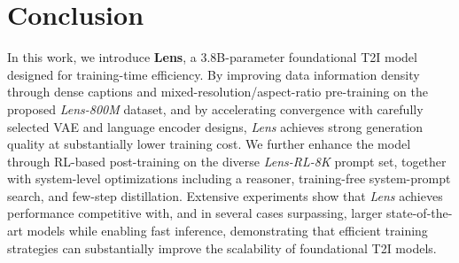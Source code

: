 
\section{Conclusion}

In this work, we introduce \textbf{Lens}, a 3.8B-parameter foundational T2I model designed for training-time efficiency. By improving data information density through dense captions and mixed-resolution/aspect-ratio pre-training on the proposed \textit{Lens-800M} dataset, and by accelerating convergence with carefully selected VAE and language encoder designs, \textit{Lens} achieves strong generation quality at substantially lower training cost. We further enhance the model through RL-based post-training on the diverse \textit{Lens-RL-8K} prompt set, together with system-level optimizations including a reasoner, training-free system-prompt search, and few-step distillation. Extensive experiments show that \textit{Lens} achieves performance competitive with, and in several cases surpassing, larger state-of-the-art models while enabling fast inference, demonstrating that efficient training strategies can substantially improve the scalability of foundational T2I models.

